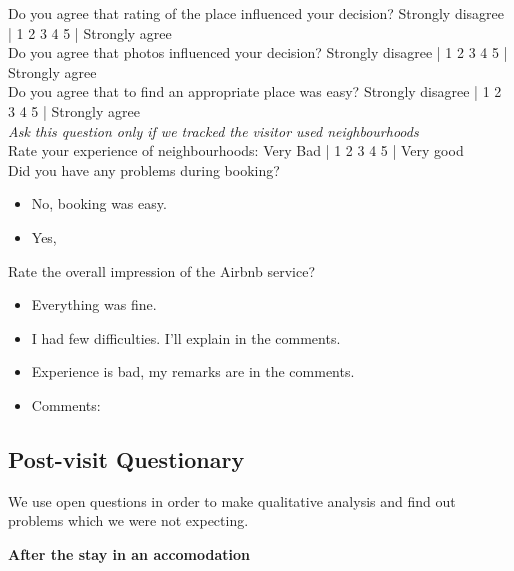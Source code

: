Do you agree that rating of the place influenced your decision?
\newline
Strongly disagree | 1 2 3 4 5 | Strongly agree \\

Do you agree that photos influenced your decision?
\newline
Strongly disagree | 1 2 3 4 5 | Strongly agree \\

Do you agree that to find an appropriate place was easy?
\newline
Strongly disagree | 1 2 3 4 5 | Strongly agree \\

\textit{Ask this question only if we tracked the visitor used neighbourhoods} \\
Rate your experience of neighbourhoods:
\newline
Very Bad | 1 2 3 4 5 | Very good \\

Did you have any problems during booking?
\begin{itemize}
	\item No, booking was easy.
    \item Yes, \underline{\hspace{8cm}}
\end{itemize}
\vspace{0.2cm}

Rate the overall impression of the Airbnb service?
\begin{itemize}
 \item Everything was fine.
 \item I had few difficulties. I'll explain in the comments.
 \item Experience is bad, my remarks are in the comments.
 \item Comments: \underline{\hspace{8cm}}   
\end{itemize} 

\subsection{Post-visit Questionary}
\label{sec:Post-visit_Questionary}

We use open questions in order to make qualitative analysis and find out problems which we were not expecting. 
\par
\vspace{0.2cm}

\textbf{After the stay in an accomodation}
\vspace{0.2cm}

